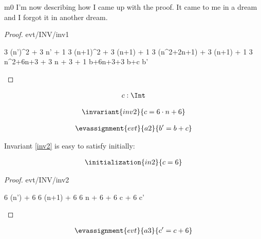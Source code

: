 \documentclass[12pt]{amsart}
\begin{document}
\begin{machine}{m0}
I'm now describing how I came up with the proof. It came to me in a dream and I forgot it in another dream.
%
\begin{proof}{evt/INV/inv1}
	\begin{calculation}
		3 \cdot (n')^2 + 3 \cdot n' + 1
	\hint{=}{ \ref{a0} }
		3 \cdot (n+1)^2 + 3 \cdot (n+1) + 1
		3 \cdot (n^2+2\cdot n+1) + 3 \cdot (n+1) + 1
		3 \cdot n^2+6\cdot n+3 + 3 \cdot n + 3 + 1
	\hint{=}{ \ref{inv1} }
		b+6\cdot n+3+3
		b+c
		b'
	\end{calculation}
\end{proof}

\begin{align*}
\variable{	c : \Int}
\end{align*}

\begin{align*}
\invariant{inv2}
{	c = 6 \cdot n + 6	}
\end{align*} 

\begin{align*}
\evassignment{evt}{a2}
{	b' = b + c	}
\end{align*}

Invariant \ref{inv2} is easy to satisfy initially:

\begin{align*}
\initialization{in2}
{	c = 6	}
\end{align*}

\begin{proof}{evt/INV/inv2}
	\begin{calculation}
		6 \cdot (n') + 6
	\hint{=}{ \ref{a0} }
		6 \cdot (n+1) + 6
	\hint{=}{ arithmetic }
		6 \cdot n + 6 + 6
	\hint{=}{ \ref{inv2} }
		c + 6
	\hint{=}{ \ref{a3} }
		c'
	\end{calculation}
\end{proof}
%
\begin{align*}
\evassignment{evt}{a3}
{	c' = c + 6	}
\end{align*}

\end{machine}
\end{document}
